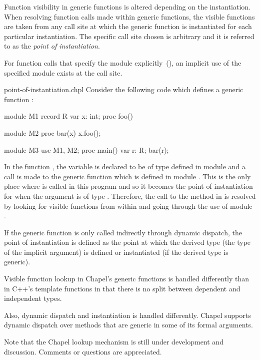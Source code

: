 Function visibility in generic functions is altered depending on the
instantiation.  When resolving function calls made within generic
functions, the visible functions are taken from any call site at which
the generic function is instantiated for each particular
instantiation.  The specific call site chosen is arbitrary and it is
referred to as the \emph{point of instantiation}.

For function calls that specify the module
explicitly~(), an implicit use of the specified
module exists at the call site.

\begin{chapelexample}{point-of-instantiation.chpl}
Consider the following code which defines a generic
function :
\begin{chapel}
module M1 {
  record R {
    var x: int;
    proc foo() { }
  }
}

module M2 {
  proc bar(x) {
    x.foo();
  }
}

module M3 {
  use M1, M2;
  proc main() {
    var r: R;
    bar(r);
  }
}
\end{chapel}
\begin{chapeloutput}
\end{chapeloutput}
In the function , the variable  is declared to be
of type  defined in module  and a call is made to the
generic function  which is defined in module .
This is the only place where  is called in this program and
so it becomes the point of instantiation for  when the
argument  is of type .  Therefore, the call to
the  method in  is resolved by looking for visible
functions from within  and going through the use of
module .
\end{chapelexample}

If the generic function is only called indirectly through dynamic
dispatch, the point of instantiation is defined as the point at which
the derived type (the type of the implicit  argument) is
defined or instantiated (if the derived type is generic).

\begin{rationale}
Visible function lookup in Chapel's generic functions is handled
differently than in C++'s template functions in that there is no split
between dependent and independent types.

Also, dynamic dispatch and instantiation is handled differently.
Chapel supports dynamic dispatch over methods that are generic in some
of its formal arguments.

Note that the Chapel lookup mechanism is still under development and
discussion.  Comments or questions are appreciated.
\end{rationale}


